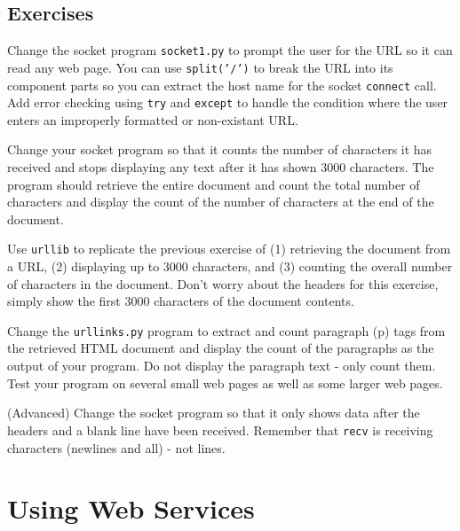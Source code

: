 \documentclass[10pt]{book}
\begin{document}
\section{Exercises}

\begin{ex}
Change the socket program {\tt socket1.py} to prompt the user for 
the URL so it can read any web page.  
You can use {\tt split('/')} to break the URL into its component parts
so you can extract the host name for the socket {\tt connect} call.
Add error checking using {\tt try} and {\tt except} to handle the condition where the 
user enters an improperly formatted or non-existant URL.  
\end{ex}

\begin{ex}
Change your socket program so that it counts the number of characters it has received 
and stops displaying any text after it has shown 3000 characters.  The program 
should retrieve the entire document and count the total number of characters 
and display the count of the number of characters at the end of the document.
\end{ex}

\begin{ex}
Use {\tt urllib} to replicate the previous exercise of (1) retrieving the document
from a URL, (2) displaying up to 3000 characters, and (3) counting the overall number
of characters in the document.  Don't worry about the headers for this exercise, simply
show the first 3000 characters of the document contents.
\end{ex}

\begin{ex}
Change the {\tt urllinks.py} program to extract and count 
paragraph (p) tags from the retrieved HTML document and 
display the count of the paragraphs as the 
output of your program.  
Do not display the paragraph text - only count them.
Test your program on several small web pages
as well as some larger web pages.
\end{ex}

\begin{ex}
(Advanced) Change the socket program so that it only shows data after the 
headers and a blank line have been received.  Remember that {\tt recv} is
receiving characters (newlines and all) - not lines.
\end{ex}


\chapter{Using Web Services}
\end{document}
